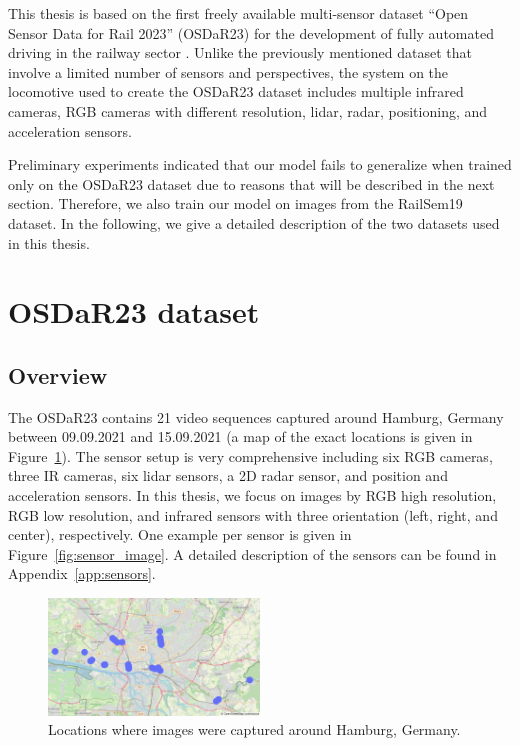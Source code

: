 \documentclass[Master,MDS,english]{BASE/twbook} %
\begin{document}
This thesis is based on the first freely available multi-sensor dataset ``Open Sensor Data for Rail 2023'' (OSDaR23) for the development of fully automated driving in the railway sector \citep{DB2023, tagiew2023osdar23}.
Unlike the previously mentioned dataset that involve a limited number of sensors and perspectives, the system on the locomotive used to create the OSDaR23 dataset includes multiple infrared cameras, RGB cameras with different resolution, lidar, radar, positioning, and acceleration sensors.

Preliminary experiments indicated that our model fails to generalize when trained only on the OSDaR23 dataset due to reasons that will be described in the next section. Therefore, we also train our model on images from the RailSem19 dataset.
In the following, we give a detailed description of the two datasets used in this thesis.


\section{OSDaR23 dataset} \label{sec:OSDaR23}

\subsection{Overview}

The OSDaR23 contains 21 video sequences captured around Hamburg, Germany between 09.09.2021 and 15.09.2021 (a map of the exact locations is given in Figure~\ref{fig:map}). 
The sensor setup is very comprehensive including six RGB cameras, three
IR cameras, six lidar sensors, a 2D radar sensor, and position and acceleration sensors. In this thesis, we focus on images by RGB high resolution, RGB low resolution, and infrared sensors with three orientation (left, right, and center), respectively. One example per sensor is given in Figure~\ref{fig:sensor_image}. A detailed description of the sensors can be found in Appendix~\ref{app:sensors}.

\begin{figure}[h]
\centering
\includegraphics[width=0.5\textwidth]{images/datasets/db/map}
\caption{Locations where images were captured around Hamburg, Germany. }
\label{fig:map}
\end{figure}
\end{document}
